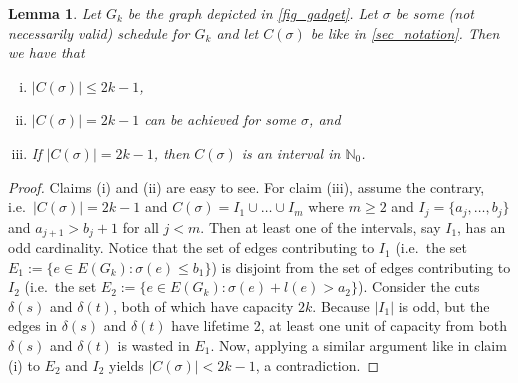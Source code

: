 \documentclass[10pt,a4paper]{article}
\newtheorem{lemma}[theorem]{Lemma}
\numberwithin{equation}{section}
\newcommand{\N}{\mathbb{N}}
\newcommand{\set}[1]{\{ #1 \}}
\newcommand{\fromto}[2]{\set{#1, \ldots, #2}}
\begin{document}
\begin{lemma}
\label{lemma_gadget}
Let $G_k$ be the graph depicted in \cref{fig_gadget}. Let $\sigma$ be some (not necessarily valid) schedule for $G_k$ and let $C(\sigma)$ be like in \cref{sec_notation}. Then we have that \begin{enumerate}[(i)]
\item $|C(\sigma)| \leq 2k -1$,
\item $|C(\sigma)| = 2k -1$ can be achieved for some $\sigma$, and
\item If $|C(\sigma)| = 2k -1$, then $C(\sigma)$ is an interval in $\N_0$. \label{lemma_gadget_case_3}
\end{enumerate}
\end{lemma}
\begin{proof}
Claims (i) and (ii) are easy to see. For claim (iii), assume the contrary, i.e.\ $|C(\sigma)| = 2k -1$ and $C(\sigma) = I_1 \cup \dots \cup I_m$ where $m \geq 2$ and $I_j = \fromto{a_j}{b_j}$ and $a_{j+1} > b_j + 1$ for all $j < m$. Then at least one of the intervals, say $I_1$, has an odd cardinality. Notice that the set of edges contributing to $I_1$ (i.e.\ the set $E_1 := \set{e \in E(G_k) : \sigma(e) \leq b_1}$) is disjoint from the set of edges contributing to $I_2$ (i.e.\ the set $E_2 := \set{e \in E(G_k) : \sigma(e) + l(e) > a_2}$). Consider the cuts $\delta(s)$ and $\delta(t)$, both of which have capacity $2k$. Because $|I_1|$ is odd, but the edges in $\delta(s)$ and $\delta(t)$ have lifetime 2, at least one unit of capacity from both $\delta(s)$ and $\delta(t)$ is wasted in $E_1$. Now, applying a similar argument like in claim (i) to $E_2$ and $I_2$ yields $|C(\sigma)| < 2k - 1$, a contradiction. 
\end{proof}
\end{document}
